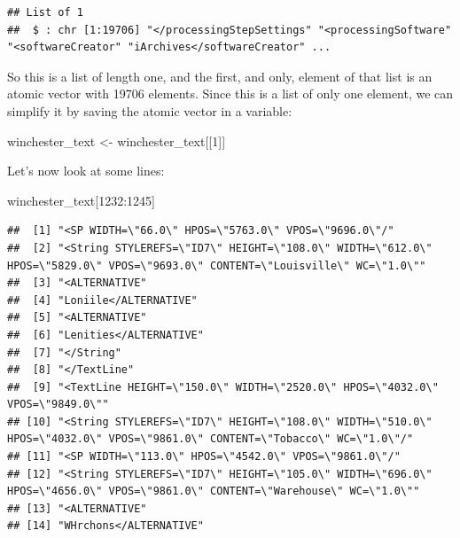 \documentclass[
]{article}
\newenvironment{Shaded}{\begin{snugshade}}{\end{snugshade}}
\newcommand{\DecValTok}[1]{\textcolor[rgb]{0.00,0.00,0.81}{#1}}
\newcommand{\NormalTok}[1]{#1}
\newcommand{\OtherTok}[1]{\textcolor[rgb]{0.56,0.35,0.01}{#1}}
\newcommand{\SpecialCharTok}[1]{\textcolor[rgb]{0.00,0.00,0.00}{#1}}
\begin{document}
\begin{verbatim}
## List of 1
##  $ : chr [1:19706] "</processingStepSettings" "<processingSoftware" "<softwareCreator" "iArchives</softwareCreator" ...
\end{verbatim}

So this is a list of length one, and the first, and only, element of that list is an atomic vector
with 19706 elements. Since this is a list of only one element, we can simplify it by saving the
atomic vector in a variable:

\begin{Shaded}
\begin{Highlighting}[]
\NormalTok{winchester\_text }\OtherTok{\textless{}{-}}\NormalTok{ winchester\_text[[}\DecValTok{1}\NormalTok{]]}
\end{Highlighting}
\end{Shaded}

Let's now look at some lines:

\begin{Shaded}
\begin{Highlighting}[]
\NormalTok{winchester\_text[}\DecValTok{1232}\SpecialCharTok{:}\DecValTok{1245}\NormalTok{]}
\end{Highlighting}
\end{Shaded}

\begin{verbatim}
##  [1] "<SP WIDTH=\"66.0\" HPOS=\"5763.0\" VPOS=\"9696.0\"/"                                                                         
##  [2] "<String STYLEREFS=\"ID7\" HEIGHT=\"108.0\" WIDTH=\"612.0\" HPOS=\"5829.0\" VPOS=\"9693.0\" CONTENT=\"Louisville\" WC=\"1.0\""
##  [3] "<ALTERNATIVE"                                                                                                                
##  [4] "Loniile</ALTERNATIVE"                                                                                                        
##  [5] "<ALTERNATIVE"                                                                                                                
##  [6] "Lenities</ALTERNATIVE"                                                                                                       
##  [7] "</String"                                                                                                                    
##  [8] "</TextLine"                                                                                                                  
##  [9] "<TextLine HEIGHT=\"150.0\" WIDTH=\"2520.0\" HPOS=\"4032.0\" VPOS=\"9849.0\""                                                 
## [10] "<String STYLEREFS=\"ID7\" HEIGHT=\"108.0\" WIDTH=\"510.0\" HPOS=\"4032.0\" VPOS=\"9861.0\" CONTENT=\"Tobacco\" WC=\"1.0\"/"  
## [11] "<SP WIDTH=\"113.0\" HPOS=\"4542.0\" VPOS=\"9861.0\"/"                                                                        
## [12] "<String STYLEREFS=\"ID7\" HEIGHT=\"105.0\" WIDTH=\"696.0\" HPOS=\"4656.0\" VPOS=\"9861.0\" CONTENT=\"Warehouse\" WC=\"1.0\"" 
## [13] "<ALTERNATIVE"                                                                                                                
## [14] "WHrchons</ALTERNATIVE"
\end{verbatim}
\end{document}
